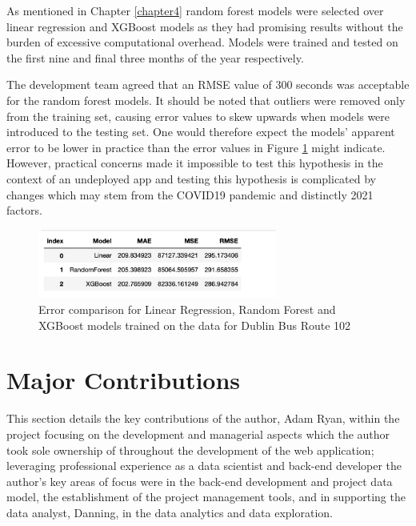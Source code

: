 \documentclass[]{UCD_CS_47360_Report}
\begin{document}
As mentioned in Chapter \ref{chapter4} random forest models were selected over linear regression and XGBoost models as they had promising results without the burden of excessive computational overhead.
Models were trained and tested on the first nine and final three months of the year respectively.

The development team agreed that an RMSE value of 300 seconds was acceptable for the random forest models.
It should be noted that outliers were removed only from the training set, causing error values to skew upwards when models were introduced to the testing set.
One would therefore expect the models' apparent error to be lower in practice than the error values in Figure \ref{fig:modelComparison} might indicate.
However, practical concerns made it impossible to test this hypothesis in the context of an undeployed app and testing this hypothesis is complicated by changes which may stem from the COVID19 pandemic and distinctly 2021 factors.

\begin{figure}[!htb]
    \centering
    \includegraphics[width=0.7\textwidth]{figures/route_102_model_comparison.png}
    \caption{Error comparison for Linear Regression, Random Forest and XGBoost models trained on the data for Dublin Bus Route 102}
    \label{fig:modelComparison}
\end{figure}


\chapter{\label{chapter6}Major Contributions}
This section details the key contributions of the author, Adam Ryan, within the project focusing on the development and managerial aspects which the author took sole ownership of throughout the development of the web application; leveraging professional experience as a data scientist and back-end developer the author's key areas of focus were in the back-end development and project data model, the establishment of the project management tools, and in supporting the data analyst, Danning, in the data analytics and data exploration.
\end{document}
